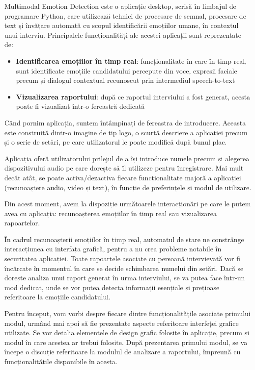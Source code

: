 \documentclass[a4paper, 12pt]{report}
\begin{document}
	Multimodal Emotion Detection este o aplicație desktop, scrisă în limbajul de programare Python, care utilizează tehnici de procesare de semnal, procesare de text și învățare automată cu scopul identificării emoțiilor umane, în contextul unui interviu. Principalele funcționalități ale acestei aplicații sunt reprezentate de:
	\begin{itemize}
	 	\item \textbf{Identificarea emoțiilor în timp real}: funcționalitate în care în timp real, sunt identificate emoțiile candidatului percepute din voce, expresii faciale precum și dialogul contextual recunoscut prin intermediul speech-to-text
		\item \textbf{Vizualizarea raportului}: după ce raportul interviului a fost generat, acesta poate fi vizualizat într-o fereastră dedicată
	\end{itemize}

	Când pornim aplicația, suntem întâmpinați de fereastra de introducere. Aceasta este construită dintr-o imagine de tip logo, o scurtă descriere a aplicației precum și o serie de setări, pe care utilizatorul le poate modifică după bunul plac.
	
	Aplicația oferă utilizatorului prilejul de a își introduce numele precum și alegerea dispozitivului audio pe care dorește să îl utilizeze pentru înregistrare. Mai mult decât atât, se poate activa/dezactiva fiecare funcționalitate majoră a aplicației (recunoaștere audio, video și text), în funcție de preferințele și modul de utilizare.
	
	Din acest moment, avem la dispoziție următoarele interacționări pe care le putem avea cu aplicația: recunoașterea emoțiilor în timp real sau vizualizarea rapoartelor.
	
	În cadrul recunoașterii emoțiilor în timp real, automatul de stare ne constrânge interacțiunea cu interfața grafică, pentru a nu crea probleme notabile în securitatea aplicației. Toate rapoartele asociate cu persoană intervievată vor fi încărcate în momentul în care se decide schimbarea numelui din setări. Dacă se dorește analiza unui raport generat în urma interviului, se va putea face într-un mod dedicat, unde se vor putea detecta informații esențiale și prețioase referitoare la emoțiile candidatului.
	
	\bigskip
	Pentru început, vom vorbi despre fiecare dintre funcționalitățile asociate primului modul, urmând mai apoi să fie prezentate aspecte referitoare interfeței grafice utilizate. Se vor detalia elementele de design grafic folosite în aplicație, precum și modul în care acestea ar trebui folosite. După prezentarea primului modul, se va începe o discuție referitoare la modulul de analizare a raportului, împreună cu funcționalitățile disponibile în acesta.
	
\end{document}
